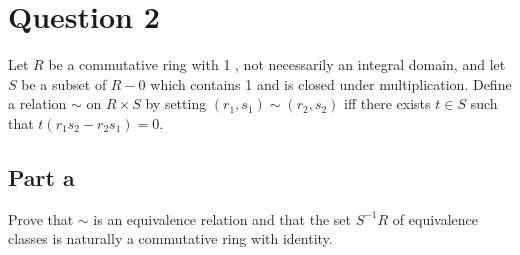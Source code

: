 \section{Question 2}

\begin{question}
    Let $R$ be a commutative ring with 1 , not necessarily an integral domain, and let $S$ be a subset of $R-0$ which contains 1 and is closed under multiplication. Define a relation $\sim$ on $R \times S$ by setting $\left(r_1, s_1\right) \sim\left(r_2, s_2\right)$ iff there exists $t \in S$ such that $t\left(r_1 s_2-r_2 s_1\right)=0$.
\end{question}

\subsection{Part a}

\begin{question}
    Prove that $\sim$ is an equivalence relation and that the set $S^{-1} R$ of equivalence classes is naturally a commutative ring with identity.
\end{question}

